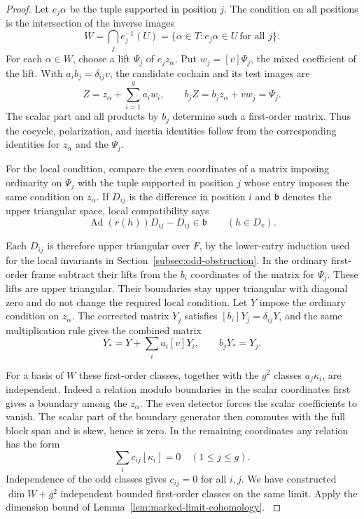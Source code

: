 \begin{proof}
Let \(e_j\alpha\) be the tuple supported in position \(j\). The condition on all positions is the intersection of the inverse images
\[
 W=\bigcap_j e_j^{-1}(U)=\{\alpha\in T:e_j\alpha\in U\ \text{for all }j\}.
\] For each \(\alpha\in W\), choose a lift
\(\Psi_j\) of \(e_jz_\alpha\). Put \(w_j=[v]\Psi_j\), the mixed coefficient of the lift. With \(a_i b_j=\delta_{ij}v\), the candidate cochain and its test images are 
\[
 Z=z_\alpha+\sum_{i=1}^g a_iw_i,\qquad b_jZ=b_jz_\alpha+vw_j=\Psi_j.
\]
 The scalar part and all products by
\(b_j\) determine such a first-order matrix. Thus the
cocycle, polarization, and inertia identities follow
from the corresponding identities for \(z_\alpha\)
and the \(\Psi_j\).

For the local condition, compare the even coordinates
of a matrix imposing ordinarity on \(\Psi_j\) with the tuple supported in
position \(j\) whose entry imposes the same condition on \(z_\alpha\). If \(D_{ij}\) is the difference in position \(i\) and \(\mathfrak b\) denotes the upper triangular space, local compatibility says 
\[
 \operatorname{Ad}(r(h))D_{ij}-D_{ij}\in\mathfrak b\qquad(h\in D_v).
\]

Each \(D_{ij}\) is therefore upper triangular over \(F\),
by the lower-entry induction used for the local
invariants in Section~\ref{subsec:odd-obstruction}.
In the ordinary first-order frame subtract their
lifts from the \(b_i\) coordinates of the matrix for \(\Psi_j\). These lifts are upper triangular.
Their boundaries stay upper triangular with diagonal
zero and do not change the required local condition.
Let \(Y\) impose the ordinary condition on \(z_\alpha\). The corrected matrix \(Y_j\) satisfies \([b_i]Y_j=\delta_{ij}Y\), and the same multiplication rule gives the combined matrix 
\[
 Y_* =Y+\sum_i a_i[v]Y_i,\qquad b_jY_*=Y_j.
\]
  \label{cor:ordinary-patching-cotangent-11}

For a basis of \(W\) these first-order classes, together
with the \(g^2\) classes \(a_j\kappa_i\), are independent.
Indeed a relation modulo boundaries in the scalar
coordinates first gives a boundary among the
\(z_\alpha\). The even detector forces the scalar
coefficients to vanish. The scalar part of the
boundary generator then commutes with the full
block span and is skew, hence is zero. In the remaining coordinates any relation has the form 
\[
 \sum_i c_{ij}[\kappa_i]=0\quad (1\le j\le g).
\]
 Independence of the odd classes gives \(c_{ij}=0\) for all \(i,j\).
We have constructed \(\dim W+g^2\) independent bounded
first-order classes on the same limit. Apply the dimension
bound of Lemma~\ref{lem:marked-limit-cohomology}.
\label{cor:ordinary-patching-cotangent-12}

\end{proof}


